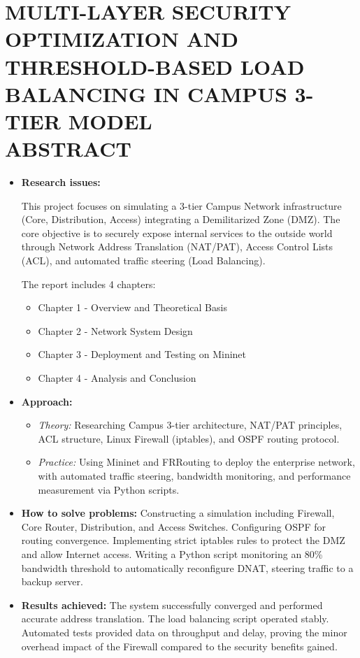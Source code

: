 \section*{\fontsize{16pt}{15pt}\selectfont MULTI-LAYER SECURITY OPTIMIZATION AND THRESHOLD-BASED LOAD BALANCING IN CAMPUS 3-TIER MODEL \\ABSTRACT}

\begin{itemize}
    \item[-] \textbf{Research issues:}
    
    This project focuses on simulating a 3-tier Campus Network infrastructure (Core, Distribution, Access) integrating a Demilitarized Zone (DMZ). The core objective is to securely expose internal services to the outside world through Network Address Translation (NAT/PAT), Access Control Lists (ACL), and automated traffic steering (Load Balancing).
    
    The report includes 4 chapters:
        \begin{itemize}
        \item[•] Chapter 1 - Overview and Theoretical Basis
        \item[•] Chapter 2 - Network System Design
        \item[•] Chapter 3 - Deployment and Testing on Mininet
        \item[•] Chapter 4 - Analysis and Conclusion
        \end{itemize}
    \item[-] \textbf{Approach:}
        \begin{itemize}
        \item[•] \textit{Theory:} Researching Campus 3-tier architecture, NAT/PAT principles, ACL structure, Linux Firewall (iptables), and OSPF routing protocol.
        \item[•] \textit{Practice:} Using Mininet and FRRouting to deploy the enterprise network, with automated traffic steering, bandwidth monitoring, and performance measurement via Python scripts.
    \end{itemize}
    \item[-] \textbf{How to solve problems:}
    Constructing a simulation including Firewall, Core Router, Distribution, and Access Switches. Configuring OSPF for routing convergence. Implementing strict iptables rules to protect the DMZ and allow Internet access. Writing a Python script monitoring an 80\% bandwidth threshold to automatically reconfigure DNAT, steering traffic to a backup server.
    \item[-] \textbf{Results achieved:}
    The system successfully converged and performed accurate address translation. The load balancing script operated stably. Automated tests provided data on throughput and delay, proving the minor overhead impact of the Firewall compared to the security benefits gained.
\end{itemize}

\newpage